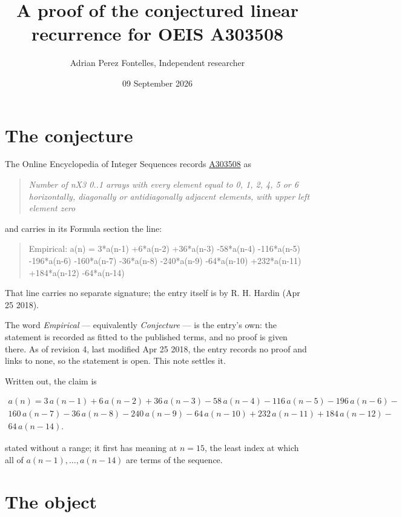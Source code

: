 \documentclass[11pt]{article}
\title{A proof of the conjectured linear recurrence for OEIS A303508}
\author{Adrian Perez Fontelles, Independent researcher}
\date{09 September 2026}
\theoremstyle{definition}
\begin{document}
\maketitle
\section{The conjecture}

The Online Encyclopedia of Integer Sequences records \href{https://oeis.org/A303508}{A303508} as

\begin{quote}\itshape Number of nX3 0..1 arrays with every element equal to 0, 1, 2, 4, 5 or 6 horizontally, diagonally or antidiagonally adjacent elements, with upper left element zero\end{quote}

and carries in its Formula section the line:

\begin{quote}\ttfamily Empirical: a(n) = 3*a(n-1) +6*a(n-2) +36*a(n-3) -58*a(n-4) -116*a(n-5) -196*a(n-6) -160*a(n-7) -36*a(n-8) -240*a(n-9) -64*a(n-10) +232*a(n-11) +184*a(n-12) -64*a(n-14)\end{quote}

That line carries no separate signature; the entry itself is by R. H. Hardin (Apr 25 2018).

The word {\itshape Empirical} --- equivalently {\itshape Conjecture} --- is the entry's own: the statement is recorded as fitted to the published terms, and no proof is given there. As of revision 4, last modified Apr 25 2018, the entry records no proof and links to none, so the statement is open. This note settles it.

Written out, the claim is

\begin{multline*} a(n) = 3\,a(n-1) + 6\,a(n-2) + 36\,a(n-3) - 58\,a(n-4) - 116\,a(n-5) - 196\,a(n-6) - \\ 160\,a(n-7) - 36\,a(n-8) - 240\,a(n-9) - 64\,a(n-10) + 232\,a(n-11) + 184\,a(n-12) - \\ 64\,a(n-14). \end{multline*}

stated without a range; it first has meaning at $n = 15$, the least index at which all of $a(n-1),\dots,a(n-14)$ are terms of the sequence.

\section{The object}
\end{document}
